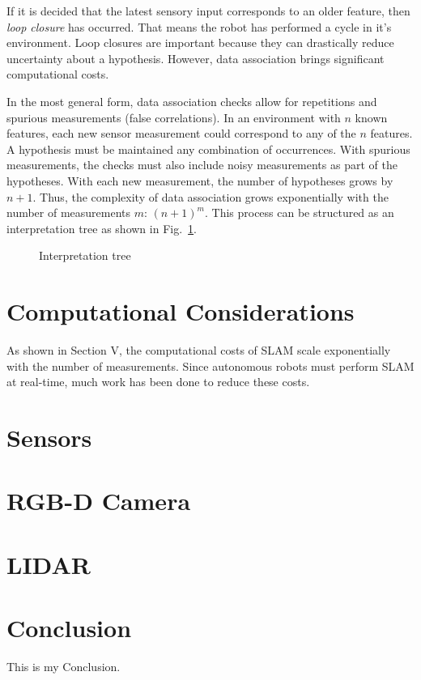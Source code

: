 \documentclass[10pt,conference]{ieeeconf}
\begin{document}
	If it is decided that the latest sensory input corresponds to an older feature, then \emph{loop closure} has occurred. That means the robot has performed a cycle in it's environment. Loop closures are important because they can drastically reduce uncertainty about a hypothesis. However, data association brings significant computational costs. 
	
	In the most general form, data association checks allow for repetitions and spurious measurements (false correlations). In an environment with $n$ known features, each new sensor measurement could correspond to any of the $n$ features. A hypothesis must be maintained any combination of occurrences. With spurious measurements, the checks must also include noisy measurements as part of the hypotheses. With each new measurement, the number of hypotheses grows by $n+1$. Thus, the complexity of data association grows exponentially with the number of measurements $m$: $(n+1)^m$. This process can be structured as an interpretation tree as shown in Fig.~\ref{tree}.
	
	\begin{figure}
	\caption{Interpretation tree}
	\label{tree}
	\end{figure}

\section {Computational Considerations}

	As shown in Section V, the computational costs of SLAM scale exponentially with the number of measurements. Since autonomous robots must perform SLAM at real-time, much work has been done to reduce these costs.
	
	
	
	
	
	
	
\section {Sensors}

	\section {RGB-D Camera}
	
	\section {LIDAR}


\section {Conclusion}
    This is my Conclusion.




\end{document}

